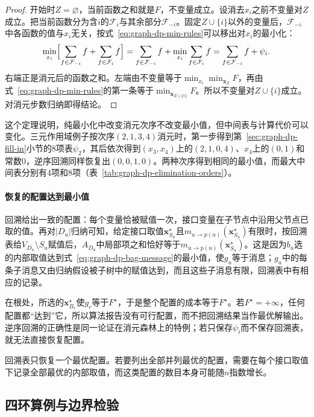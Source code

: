 \begin{proof}
开始时$Z=\varnothing$，当前函数之和就是$F$，不变量成立。设消去$x_i$之前不变量对$Z$成立。把当前函数分为含$i$的$\mathcal F_i$与其余部分$\mathcal F_{-i}$。固定$Z\cup\{i\}$以外的变量后，$\mathcal F_{-i}$中各函数的值与$x_i$无关，按式~\eqref{eq:graph-dp-min-rules}可以移出对$x_i$的最小化：
\[
\min_{x_i}\Bigl[\sum_{f\in\mathcal F_{-i}}f+\sum_{f\in\mathcal F_i}f\Bigr]
=\sum_{f\in\mathcal F_{-i}}f+\min_{x_i}\sum_{f\in\mathcal F_i}f
=\sum_{f\in\mathcal F_{-i}}f+\psi_i .
\]
右端正是消元后的函数之和。左端由不变量等于$\min_{x_i}\min_{\bm x_Z}F$，再由式~\eqref{eq:graph-dp-min-rules}的第一条等于$\min_{\bm x_{Z\cup\{i\}}}F$。所以不变量对$Z\cup\{i\}$成立。对消元步数归纳即得结论。
\end{proof}

这个定理说明，纯最小化中改变消元次序不改变最小值，但中间表与计算代价可以变化。三元作用域例子按次序$(2,1,3,4)$消元时，第一步得到第~\ref{sec:graph-dp-fill-in}小节的$8$项表$\psi_2$，其后依次得到$(x_3,x_4)$上的$(2,1,0,4)$、$x_4$上的$(0,1)$和常数$0$，逆序回溯同样恢复出$(0,0,1,0)$。两种次序得到相同的最小值，而最大中间表分别有$4$项和$8$项（表~\ref{tab:graph-dp-elimination-orders}）。

\paragraph{恢复的配置达到最小值}
回溯给出一致的配置：每个变量恰被赋值一次，接口变量在子节点中沿用父节点已取的值。再对$|D_u|$归纳可知，给定接口取值$\bm x^\star_{S_u}$且$m_{u\to p(u)}(\bm x^\star_{S_u})$有限时，按回溯表给$V_{D_u}\setminus S_u$赋值后，$A_{D_u}$中局部项之和恰好等于$m_{u\to p(u)}(\bm x^\star_{S_u})$。这是因为$b_u$选的内部取值达到式~\eqref{eq:graph-dp-bag-message}的最小值，使$g_u$等于消息；$g_u$中的每条子消息又由归纳假设被子树中的赋值达到，而且这些子消息有限，回溯表中有相应的记录。

在根处，所选的$\bm x^\star_{B_r}$使$g_r$等于$F^\star$，于是整个配置的成本等于$F^\star$。若$F^\star=+\infty$，任何配置都“达到”它，所以算法报告没有可行配置，而不把回溯结果当作最优解输出。逆序回溯的正确性是同一论证在消元森林上的特例；若只保存$\psi_i$而不保存回溯表，就无法直接恢复配置。

回溯表只恢复一个最优配置。若要列出全部并列最优的配置，需要在每个接口取值下记录全部最优的内部取值，而这类配置的数目本身可能随$n$指数增长。

\subsection{四环算例与边界检验}
\label{sec:graph-dp-four-cycle-min}

